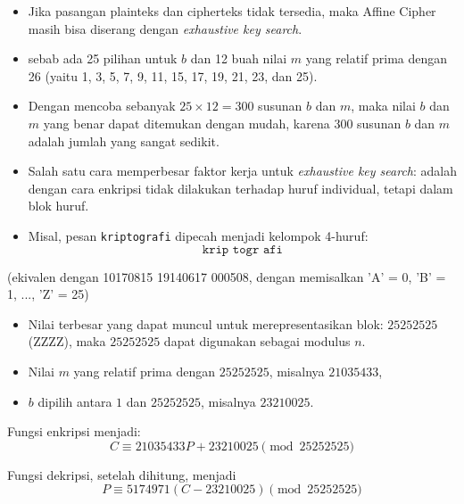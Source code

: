 \documentclass{article}
\begin{document}
\newpage


\begin{itemize}
    \item Jika pasangan plainteks dan cipherteks tidak tersedia, maka Affine Cipher masih bisa diserang dengan \textit{exhaustive key search}.
    \item sebab ada 25 pilihan untuk $b$ dan 12 buah nilai $m$ yang relatif prima dengan 26 (yaitu 1, 3, 5, 7, 9, 11, 15, 17, 19, 21, 23, dan 25).
    \item Dengan mencoba sebanyak $25 \times 12 = 300$ susunan $b$ dan $m$, maka nilai $b$ dan $m$ yang benar dapat ditemukan dengan mudah, karena 300 susunan $b$ dan $m$ adalah jumlah yang sangat sedikit.
\end{itemize}

\newpage


\begin{itemize}
    \item Salah satu cara memperbesar faktor kerja untuk \textit{exhaustive key search}: adalah dengan cara enkripsi tidak dilakukan terhadap huruf individual, tetapi dalam blok huruf.
    \item Misal, pesan \texttt{kriptografi} dipecah menjadi kelompok 4-huruf:
    \[ \texttt{krip togr afi} \]
\end{itemize}

(ekivalen dengan 10170815 19140617 000508, dengan memisalkan 'A' = 0, 'B' = 1, ..., 'Z' = 25)

\newpage


\begin{itemize}
    \item Nilai terbesar yang dapat muncul untuk merepresentasikan blok: $25252525$ (ZZZZ), maka $25252525$ dapat digunakan sebagai modulus $n$.
    \item Nilai $m$ yang relatif prima dengan $25252525$, misalnya $21035433$,
    \item $b$ dipilih antara $1$ dan $25252525$, misalnya $23210025$.
\end{itemize}

\noindent Fungsi enkripsi menjadi:
\[ C \equiv 21035433P + 23210025 \pmod{25252525} \]

\noindent Fungsi dekripsi, setelah dihitung, menjadi
\[ P \equiv 5174971 (C - 23210025) \pmod{25252525} \]
\end{document}
